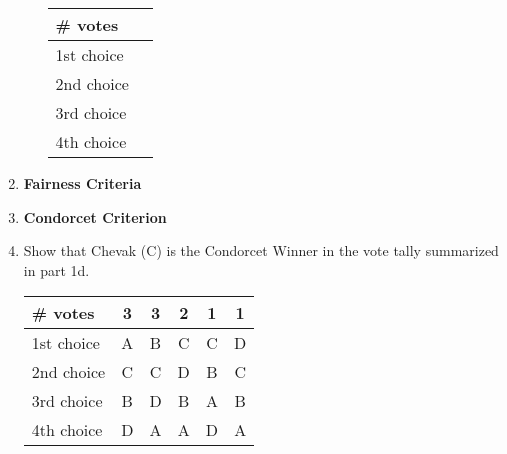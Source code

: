 \documentclass[12pt]{article}
\begin{document}
\begin{enumerate}
\begin{enumerate}
\begin{tabular}{l || c }
\# votes&\quad \hspace{4in} \quad\\
\hline
1st choice&\\
2nd choice&\\
3rd choice&\\
4th choice&\\
\end{tabular}

\end{enumerate}

\newpage

\item \textbf{Fairness Criteria}\\
\vfill

\item \textbf{Condorcet Criterion}\\
\vfill

\item Show that Chevak (C) is the Condorcet Winner in the vote tally summarized in part 1d.\\

\begin{tabular}{l || c |c|c|c|c}
\# votes&3&3&2&1&1\\
\hline
1st choice&A&B&C&C&D\\
2nd choice&C&C&D&B&C\\
3rd choice&B&D&B&A&B\\
4th choice&D&A&A&D&A\\
\end{tabular}

\vfill
\end{enumerate}
\end{document}
